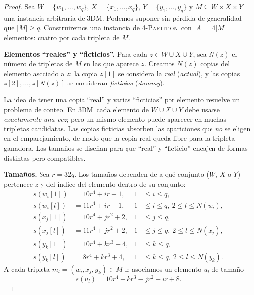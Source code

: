 \documentclass[12pt,a4paper]{article}
\theoremstyle{definition}
\theoremstyle{remark}
\newcommand{\FPART}{\textsc{4-Partition}}
\newcommand{\DM}{\textsc{3DM}}
\begin{document}
\begin{proof}
Sea $W = \{w_1,\ldots,w_q\}$, $X = \{x_1,\ldots,x_q\}$, $Y = \{y_1,\ldots,y_q\}$
y $M \subseteq W \times X \times Y$ una instancia arbitraria de \DM. Podemos
suponer sin pérdida de generalidad que $|M| \geq q$. Construiremos una instancia
de \FPART\ con $|A| = 4|M|$ elementos: cuatro por cada tripleta de $M$.

\medskip
\noindent\textbf{Elementos ``reales'' y ``ficticios''.}
Para cada $z \in W \cup X \cup Y$, sea $N(z)$ el número de tripletas de $M$ en las
que aparece $z$. Creamos $N(z)$ copias del elemento asociado a $z$: la copia
$z[1]$ se considera la \emph{real} (\textit{actual}), y las copias
$z[2], \ldots, z[N(z)]$ se consideran \emph{ficticias} (\textit{dummy}).

\begin{intuicion}
La idea de tener una copia ``real'' y varias ``ficticias'' por elemento resuelve
un problema de conteo. En \DM\ cada elemento de $W \cup X \cup Y$ debe usarse
\emph{exactamente una vez}; pero un mismo elemento puede aparecer en muchas
tripletas candidatas. Las copias ficticias absorben las apariciones que
\emph{no} se eligen en el emparejamiento, de modo que la copia real queda libre
para la tripleta ganadora. Los tamaños se diseñan para que ``real'' y ``ficticio''
encajen de formas distintas pero compatibles.
\end{intuicion}

\medskip
\noindent\textbf{Tamaños.}
Sea $r = 32q$. Los tamaños dependen de a qué conjunto ($W$, $X$ o $Y$) pertenece
$z$ y del índice del elemento dentro de su conjunto:
\[
\begin{aligned}
  s(w_i[1]) &= 10r^4 + ir + 1,      & 1 &\leq i \leq q, \\
  s(w_i[l]) &= 11r^4 + ir + 1,      & 1 &\leq i \leq q,\; 2 \leq l \leq N(w_i), \\[4pt]
  s(x_j[1]) &= 10r^4 + jr^2 + 2,    & 1 &\leq j \leq q, \\
  s(x_j[l]) &= 11r^4 + jr^2 + 2,    & 1 &\leq j \leq q,\; 2 \leq l \leq N(x_j), \\[4pt]
  s(y_k[1]) &= 10r^4 + kr^3 + 4,    & 1 &\leq k \leq q, \\
  s(y_k[l]) &= 8r^4 + kr^3 + 4,     & 1 &\leq k \leq q,\; 2 \leq l \leq N(y_k).
\end{aligned}
\]
A cada tripleta $m_l = (w_i, x_j, y_k) \in M$ le asociamos un elemento $u_l$ de
tamaño
\[
  s(u_l) = 10r^4 - kr^3 - jr^2 - ir + 8.
\]


\end{proof}
\end{document}
